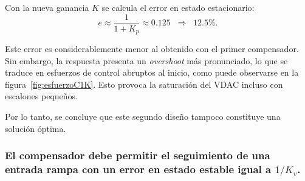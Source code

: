 

Con la nueva ganancia $K$ se calcula el error en estado estacionario:
\[
e \approx \frac{1}{1+K_p} \approx 0.125 \;\; \Rightarrow \;\; 12.5\%.
\]

Este error es considerablemente menor al obtenido con el primer compensador. Sin embargo, la respuesta presenta un \emph{overshoot} más pronunciado, lo que se traduce en esfuerzos de control abruptos al inicio, como puede observarse en la figura~\ref{fig:esfuerzoC1K}. Esto provoca la saturación del VDAC incluso con escalones pequeños.  

Por lo tanto, se concluye que este segundo diseño tampoco constituye una solución óptima.

\subsubsection{El compensador debe permitir el seguimiento de una entrada rampa con un error en estado estable igual a $1/K_v$.}


